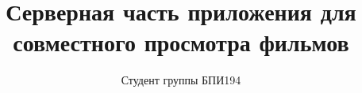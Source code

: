 \documentclass{../../includes/TechDoc}
\title{Серверная часть приложения для совместного просмотра фильмов}
\author{Студент группы БПИ194}{Анненков В. А.}
\begin{document}
    \maketitle

    \tableofcontents

    \newpage
    
    \newpage

    

    

    

    

    

    

    

    

    

    \registrationList
\end{document}
